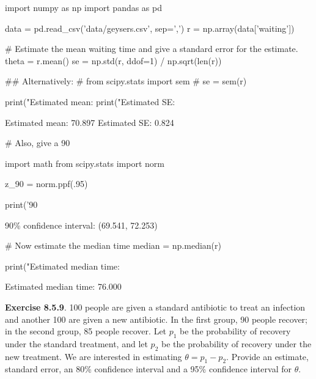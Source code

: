 \begin{python}
import numpy as np
import pandas as pd

data = pd.read_csv('data/geysers.csv', sep=',')
r = np.array(data['waiting'])
\end{python}

\begin{python}
# Estimate the mean waiting time and give a standard error for the estimate.
theta = r.mean()
se = np.std(r, ddof=1) / np.sqrt(len(r))

## Alternatively:
# from scipy.stats import sem
# se = sem(r)

print("Estimated mean: %
print("Estimated SE: %
\end{python}

\begin{console}
Estimated mean: 70.897
Estimated SE: 0.824
\end{console}

\begin{python}
# Also, give a 90%

import math
from scipy.stats import norm

z_90 = norm.ppf(.95)

print('90%
\end{python}

\begin{console}
90\% confidence interval: (69.541, 72.253)
\end{console}

\begin{python}
# Now estimate the median time
median = np.median(r)

print("Estimated median time: %
\end{python}

\begin{console}
Estimated median time: 76.000
\end{console}

\textbf{Exercise 8.5.9}. 100 people are given a standard antibiotic to
treat an infection and another 100 are given a new antibiotic. In the
first group, 90 people recover; in the second group, 85 people recover.
Let \(p_{1}\) be the probability of recovery under the standard treatment,
and let \(p_{2}\) be the probability of recovery under the new treatment.
We are interested in estimating \(\theta = p_{1} - p_{2}\). Provide an
estimate, standard error, an 80\% confidence interval and a 95\%
confidence interval for \(\theta\).

